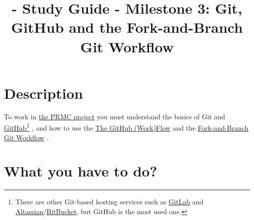 
\title{\SM - Study Guide - Milestone 3: Git, GitHub and the Fork-and-Branch Git Workflow}

\maketitle

\tableofcontents

\lstset{
  showstringspaces=false,
  upquote=true
}

\section{Description}

To work in
\href{https://github.com/Sistemas-Multimedia/PRMC}{the PRMC
  project} you must understand the basics of
Git \cite{Git-book} and
\href{https://github.com/}{GitHub}\footnote{There are other Git-based
hosting services such as \href{https://about.gitlab.com/}{GitLab} and
\href{https://www.atlassian.com/git}{Altassian}/\href{https://bitbucket.org/product}{BitBucket},
but GitHub is the most used one.} \cite{GitHub}, and how to use the
\href{https://guides.github.com/introduction/flow/index.html}{The
  GitHub (Work)Flow} and the
\href{https://github.com/vicente-gonzalez-ruiz/fork_and_branch_git_workflow}{Fork-and-Branch
  Git Workflow} \cite{fork-and-branch-git-workflow}.

\section{What you have to do?}

